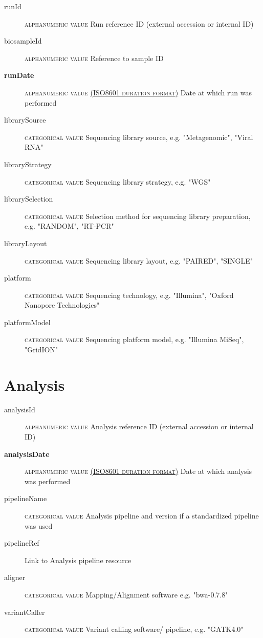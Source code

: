 \documentclass[a4paper, 10pt]{article}        %
\begin{document}
  \begin{description}
	\item[runId] {\textsc{alphanumeric value}} Run reference ID (external accession or internal ID)
	\item[biosampleId] {\textsc{alphanumeric value}}  Reference to sample ID
	\item[\textbf{runDate}] {\textsc{alphanumeric value \href{https://www.iso.org/iso-8601-date-and-time-format.html}{(ISO8601 duration format)}}} Date at which run was performed	
	\item[librarySource] {\textsc{categorical value}}  Sequencing library source, e.g. "Metagenomic", "Viral RNA"
	\item[libraryStrategy]  {\textsc{categorical value}} Sequencing library strategy, e.g. "WGS"
	\item[librarySelection] {\textsc{categorical value}} Selection method for sequencing library preparation, e.g. "RANDOM", "RT-PCR"
	\item[libraryLayout] {\textsc{categorical value}}  Sequencing library layout, e.g. "PAIRED", "SINGLE"
	\item[platform] {\textsc{categorical value}} Sequencing technology, e.g. "Illumina", "Oxford Nanopore Technologies"
	\item[platformModel] {\textsc{categorical value}} Sequencing platform model, e.g. "Illumina MiSeq", "GridION"
 \end{description}
 
 
 
   \section*{ {\color{teal} Analysis}}
  
  \begin{description}
	\item[analysisId] {\textsc{alphanumeric value}} Analysis reference ID (external accession or internal ID)
	\item[\textbf{analysisDate}] {\textsc{alphanumeric value \href{https://www.iso.org/iso-8601-date-and-time-format.html}{(ISO8601 duration format)}}} Date at which analysis was performed  
	\item[pipelineName]  {\textsc{categorical value}} Analysis pipeline and version if a standardized pipeline was used
	\item[pipelineRef]  Link to Analysis pipeline resource
	\item[aligner]  {\textsc{categorical value}} Mapping/Alignment software e.g. "bwa-0.7.8"
	  \item[variantCaller]  {\textsc{categorical value}} Variant calling software/ pipeline, e.g. "GATK4.0" %
 \end{description}
 
\end{document}
